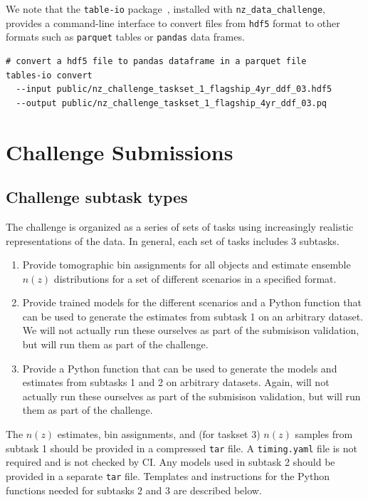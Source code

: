 \documentclass[11pt,twoside,letterpaper,onecolumn,english]{article}
\begin{document}
We note that the \texttt{table-io} package~\cite{tables_io},
installed with \texttt{nz\_data\_challenge}, provides a command-line interface to
convert files from \texttt{hdf5} format to other formats such as
\texttt{parquet} tables or \texttt{pandas} data frames.

\begin{verbatim}
# convert a hdf5 file to pandas dataframe in a parquet file
tables-io convert
  --input public/nz_challenge_taskset_1_flagship_4yr_ddf_03.hdf5
  --output public/nz_challenge_taskset_1_flagship_4yr_ddf_03.pq
\end{verbatim}


\section{Challenge Submissions}
\label{sec:challenge_submissions}

\subsection{Challenge subtask types}

The challenge is organized as a series of sets of tasks using
increasingly realistic representations of the data. In general, each
set of tasks includes 3 subtasks.

\begin{enumerate}
\item{Provide tomographic bin assignments for all objects and estimate ensemble $n(z)$
      distributions for a set of different scenarios in a specified format.}
  \item{Provide trained models for the different scenarios and a
      Python function that can be used to generate the estimates from subtask
      1 on an arbitrary dataset.  We will not actually run these ourselves as part of the submisison validation,
      but will run them as part of the challenge.}
  \item{Provide a Python function that can be used to
      generate the models and estimates from subtasks 1 and 2 on
      arbitrary datasets.  Again, will not actually run these ourselves as part of the submisison validation,
      but will run them as part of the challenge.}
\end{enumerate}

The $n(z)$ estimates, bin assignments, and (for taskset 3) $n(z)$ samples
from subtask 1 should be provided in a compressed \texttt{tar} file.
A \texttt{timing.yaml} file is not required and is not checked by CI.
Any models used in subtask 2 should be provided in a separate \texttt{tar} file.
Templates and instructions for the Python functions needed for subtasks 2 and 3 are
described below. 
\end{document}
